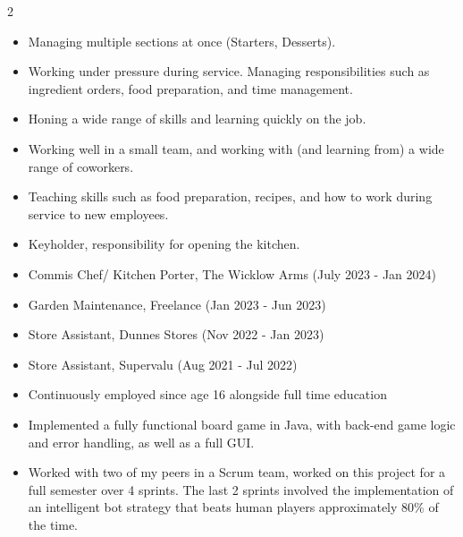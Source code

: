 \documentclass[10pt,a4paper,withhyper]{altacv}
\begin{document}
\begin{paracol}{2}

\begin{itemize}
\item Managing multiple sections at once (Starters, Desserts).  
\item Working under pressure during service. Managing responsibilities such as ingredient orders, food preparation, and time management.  
\item Honing a wide range of skills and learning quickly on the job. 
\item Working well in a small team, and working with (and learning from) a wide range of coworkers. 
\item Teaching skills such as food preparation, recipes, and how to work during service to new employees. 
\item Keyholder, responsibility for opening the kitchen.
\end{itemize}

\divider

\begin{itemize}
    \item Commis Chef/ Kitchen Porter, The Wicklow Arms (July 2023 - Jan 2024)
    \item Garden Maintenance, Freelance (Jan 2023 - Jun 2023)
    \item Store Assistant, Dunnes Stores (Nov 2022 - Jan 2023)
    \item Store Assistant, Supervalu (Aug 2021 - Jul 2022)
\divider
    \item Continuously employed since age 16 alongside full time education
\end{itemize}


\begin{itemize}
\item Implemented a fully functional board game in Java, with back-end game logic and error handling, as well as a full GUI.
\item Worked with two of my peers in a Scrum team, worked on this project for a full semester over 4 sprints. The last 2 sprints involved the implementation of an intelligent bot strategy that beats human players approximately 80\% of the time.


\end{itemize}
\end{paracol}
\end{document}
